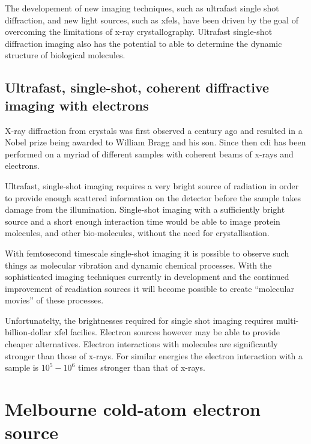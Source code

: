 The developement of new imaging techniques, such as ultrafast single shot diffraction, and new light sources, such as \glspl{xfel}, have been driven by the goal of overcoming the limitations of x-ray crystallography. Ultrafast single-shot diffraction imaging also has the potential to able to determine the dynamic structure of biological molecules.



\subsection{Ultrafast, single-shot, coherent diffractive imaging with electrons}

X-ray diffraction from crystals was first observed a century ago\cite{bragg_x-rays_1912} and resulted in a Nobel prize being awarded to William Bragg and his son. Since then \gls{cdi} has been performed on a myriad of different samples with coherent beams of x-rays and electrons.

Ultrafast, single-shot imaging requires a very bright source of radiation in order to provide enough scattered information on the detector before the sample takes damage from the illumination\cite{henderson_potential_1995}. Single-shot imaging with a sufficiently bright source and a short enough interaction time would be able to image protein molecules, and other bio-molecules, without the need for crystallisation.\cite{neutze_potential_2000}

With femtosecond timescale single-shot imaging it is possible to observe such things as molecular vibration and dynamic chemical processes\cite{zewail_4d_2006}. With the sophisticated imaging techniques currently in development and the continued improvement of readiation sources it will become possible to create ``molecular movies''\cite{dwyer_femtosecond_2006} of these processes.

Unfortunatelty, the brightnesses required for single shot imaging requires multi-billion-dollar \gls{xfel} facilies. Electron sources however may be able to provide cheaper alternatives. Electron interactions with molecules are significantly stronger than those of x-rays. For similar energies the electron interaction with a sample is $10^5-10^6$ times stronger than that of x-rays.\cite{sciaini_femtosecond_2011}

\section{Melbourne cold-atom electron source}

